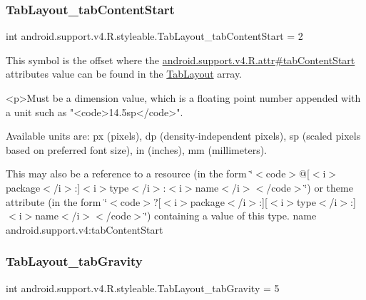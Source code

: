 \subsubsection{\texorpdfstring{Tab\+Layout\+\_\+tab\+Content\+Start}{TabLayout\_tabContentStart}}
{\footnotesize\ttfamily int android.\+support.\+v4.\+R.\+styleable.\+Tab\+Layout\+\_\+tab\+Content\+Start = 2\hspace{0.3cm}{\ttfamily [static]}}

This symbol is the offset where the \hyperlink{classandroid_1_1support_1_1v4_1_1R_1_1attr_ac204edcd2e822d7fbf8758c3d7ebd316}{android.\+support.\+v4.\+R.\+attr\#tab\+Content\+Start} attribute\textquotesingle{}s value can be found in the \hyperlink{classandroid_1_1support_1_1v4_1_1R_1_1styleable_a48e866d7121b40ef0bb3d467759606a9}{Tab\+Layout} array.

\begin{DoxyVerb}      <p>Must be a dimension value, which is a floating point number appended with a unit such as "<code>14.5sp</code>".
\end{DoxyVerb}
 Available units are\+: px (pixels), dp (density-\/independent pixels), sp (scaled pixels based on preferred font size), in (inches), mm (millimeters). 

This may also be a reference to a resource (in the form \char`\"{}$<$code$>$@\mbox{[}$<$i$>$package$<$/i$>$\+:\mbox{]}$<$i$>$type$<$/i$>$\+:$<$i$>$name$<$/i$>$$<$/code$>$\char`\"{}) or theme attribute (in the form \char`\"{}$<$code$>$?\mbox{[}$<$i$>$package$<$/i$>$\+:\mbox{]}\mbox{[}$<$i$>$type$<$/i$>$\+:\mbox{]}$<$i$>$name$<$/i$>$$<$/code$>$\char`\"{}) containing a value of this type.  name android.\+support.\+v4\+:tab\+Content\+Start \mbox{\label{classandroid_1_1support_1_1v4_1_1R_1_1styleable_acebed0639553b18aced9e7b66e38ac1d}} 
\subsubsection{\texorpdfstring{Tab\+Layout\+\_\+tab\+Gravity}{TabLayout\_tabGravity}}
{\footnotesize\ttfamily int android.\+support.\+v4.\+R.\+styleable.\+Tab\+Layout\+\_\+tab\+Gravity = 5\hspace{0.3cm}{\ttfamily [static]}}

